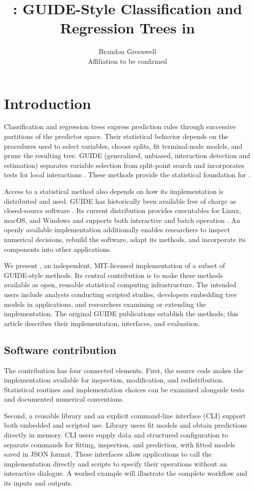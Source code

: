 \documentclass[article]{jss}
\author{Brandon Greenwell\\Affiliation to be confirmed}
\title{\pkg{guide-rs}: GUIDE-Style Classification and Regression Trees
  in \proglang{Rust}}
\begin{document}
\section{Introduction}\label{sec:introduction}

Classification and regression trees express prediction rules through
successive partitions of the predictor space. Their statistical behavior
depends on the procedures used to select variables, choose splits, fit
terminal-node models, and prune the resulting tree. GUIDE (generalized,
unbiased, interaction detection and estimation) separates variable selection
from split-point search and incorporates tests for local interactions
\citep{Loh:2002,Loh:2009}. These methods provide the statistical foundation
for .

Access to a statistical method also depends on how its implementation is
distributed and used. GUIDE has historically been available free of charge
as closed-source software \citep{Rusch+Zeileis:2014}. Its current distribution
provides executables for Linux, macOS, and Windows and supports both
interactive and batch operation \citep{GUIDE:software}. An openly available
implementation additionally enables researchers to inspect numerical
decisions, rebuild the software, adapt its methods, and incorporate its
components into other applications.

We present , an independent, MIT-licensed implementation of
a subset of GUIDE-style methods. Its central contribution is to make these
methods available as open, reusable statistical computing infrastructure.
The intended users include analysts conducting scripted studies, developers
embedding tree models in applications, and researchers examining or extending
the implementation. The original GUIDE publications establish the methods;
this article describes their implementation, interfaces, and evaluation.

\subsection{Software contribution}\label{sec:contribution}

The contribution has four connected elements. First, the source code makes
the implementation available for inspection, modification, and redistribution.
Statistical routines and implementation choices can be examined alongside
tests and documented numerical conventions.

Second, a reusable  library and an explicit command-line
interface (CLI) support both embedded and scripted use. Library users fit
models and obtain predictions directly in memory. CLI users supply data and
structured configuration to separate commands for fitting, inspection, and
prediction, with fitted models saved in JSON format. These interfaces allow
applications to call the implementation directly and scripts to specify
their operations without an interactive dialogue. A worked example will
illustrate the complete workflow and its inputs and outputs.
\end{document}
